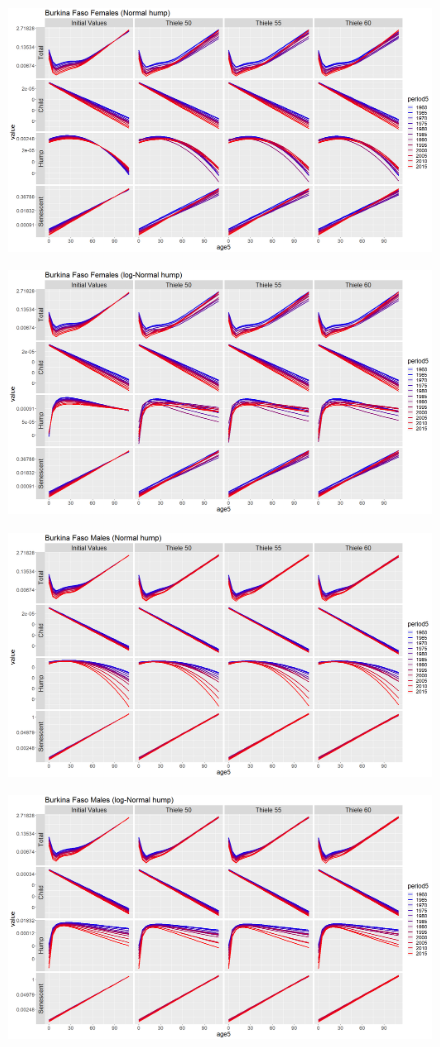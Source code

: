 \documentclass[12pt,a4paper]{article}
\begin{document}
\newpage
\begin{figure}[H]
\includegraphics[width = \linewidth]{decomp females normal.png}
\end{figure}
\begin{figure}[H]
\includegraphics[width = \linewidth]{decomp females log-normal.png}
\end{figure}

\newpage
\begin{figure}[H]
\includegraphics[width = \linewidth]{decomp males normal.png}
\end{figure}
\begin{figure}[H]
\includegraphics[width = \linewidth]{decomp males log-normal.png}
\end{figure}
\end{document}
